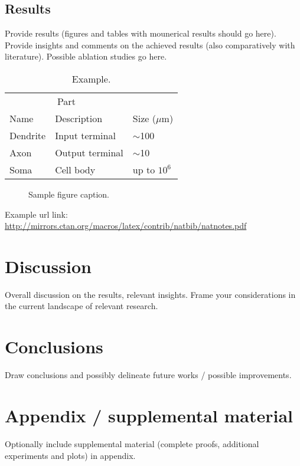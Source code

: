 \documentclass{article}
\begin{document}
\subsection{Results} Provide results (figures and tables with mounerical results should go here). Provide insights and comments on the achieved results (also comparatively with literature). Possible ablation studies go here.

\begin{table}
  \caption{Example.}
  \label{sample-table}
  \centering
  \begin{tabular}{lll}
    \toprule
    \multicolumn{2}{c}{Part}                   \\
    \cmidrule(r){1-2}
    Name     & Description     & Size ($\mu$m) \\
    \midrule
    Dendrite & Input terminal  & $\sim$100     \\
    Axon     & Output terminal & $\sim$10      \\
    Soma     & Cell body       & up to $10^6$  \\
    \bottomrule
  \end{tabular}
\end{table}

\begin{figure}
  \centering
  \fbox{\rule[-.5cm]{0cm}{4cm} \rule[-.5cm]{4cm}{0cm}}
  \caption{Sample figure caption.}
\end{figure}


Example url link:
\url{http://mirrors.ctan.org/macros/latex/contrib/natbib/natnotes.pdf}

\section{Discussion}
Overall discussion on the results, relevant insights.
Frame your considerations in the current landscape of relevant research.

\section{Conclusions}
Draw conclusions and possibly delineate future works / possible improvements.




\small







\appendix

\section{Appendix / supplemental material}


Optionally include supplemental material (complete proofs, additional experiments and plots) in appendix.
\end{document}
